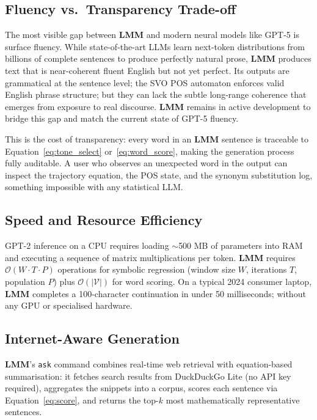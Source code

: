 \documentclass[11pt,a4paper]{article}
\newcommand{\lmm}{\texorpdfstring{%
  \textbf{\color{lmmAccent}LMM}}{LMM}}
\begin{document}
\subsection{Fluency vs.\ Transparency Trade-off}

The most visible gap between \lmm{} and modern neural models like GPT-5 is surface fluency. While state-of-the-art LLMs learn next-token distributions from billions of complete sentences to produce perfectly natural prose, \lmm{} produces text that is near-coherent fluent English but not yet perfect. Its outputs are grammatical at the sentence level; the SVO POS automaton enforces valid English phrase structure; but they can lack the subtle long-range coherence that emerges from exposure to real discourse. \lmm{} remains in active development to bridge this gap and match the current state of GPT-5 fluency.

This is the cost of transparency: every word in an \lmm{} sentence is traceable to Equation~\eqref{eq:tone_select} or~\eqref{eq:word_score}, making the generation process fully auditable. A user who observes an unexpected word in the output can inspect the trajectory equation, the POS state, and the synonym substitution log, something impossible with any statistical LLM.

\subsection{Speed and Resource Efficiency}

GPT-2 inference on a CPU requires loading $\sim$500 MB of parameters into RAM and executing a sequence of matrix multiplications per token. \lmm{} requires $\mathcal{O}(W \cdot T \cdot P)$ operations for symbolic regression (window size $W$, iterations $T$, population $P$) plus $\mathcal{O}(|\mathcal{V}|)$ for word scoring. On a typical 2024 consumer laptop, \lmm{} completes a 100-character continuation in under 50 milliseconds; without any GPU or specialised hardware.

\subsection{Internet-Aware Generation}

\lmm{}'s \texttt{ask} command combines real-time web retrieval with equation-based summarisation: it fetches search results from DuckDuckGo Lite (no API key required), aggregates the snippets into a corpus, scores each sentence via Equation~\eqref{eq:score}, and returns the top-$k$ most mathematically representative sentences.
\end{document}
